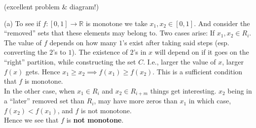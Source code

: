 \documentclass[boxes, qed]{homework}
\begin{document}
\begin{problem}(excellent problem \& diagram!)
\end{problem}
\begin{solution}
  (a) To see if $f:[0,1]\to\mathbb{R}$ is monotone we take $x_1,x_2\in[0,1]$.
  And consider the ``removed'' sets that these elements may belong to. Two cases
  arise: If $x_1,x_2\in R_i$. The value of $f$ depends on how many $1$'s exist
  after taking said steps (esp. converting the $2$'s to $1$). The existence
  of $2$'s in $x$ will depend on if it goes on the ``right'' partition, while
  constructing the set $C$. I.e., larger the value of $x$, larger $f(x)$ gets.
  Hence $x_1\ge{x_2} \implies f(x_1)\ge{f(x_2)}$. This is a sufficient condition
  that $f$ is monotone.\\
  In the other case, when $x_1\in R_i$ and $x_2\in R_{i+m}$ things get interesting.
  $x_2$ being in a ``later'' removed set than $R_i$, may have more zeros than $x_1$
  in which case, $f(x_2)<f(x_1)$, and $f$ is not monotone.\\
  Hence we see that $f$ is \textbf{not monotone}.
\end{solution}
\end{document}

